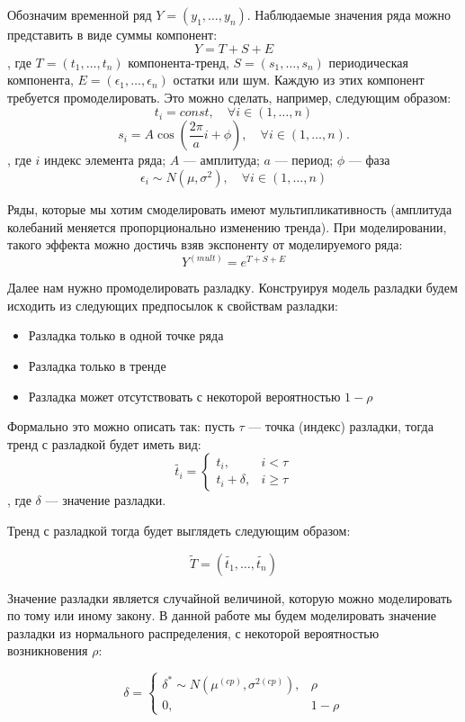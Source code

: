 \documentclass[%
12pt,
master,  %
natbib,      %
subf,        %
substylefile = spbu.rtx,
href,        %
colorlinks,  %
]{disser}
\begin{document}
Обозначим временной ряд $Y = (y_1, \dots, y_n)$. Наблюдаемые значения ряда можно представить в виде суммы компонент:
$$ Y = T + S + E $$, 
где  $ T = (t_1, \dots, t_n) $ компонента-тренд, $ S = (s_1, \dots, s_n) $ периодическая компонента, $ E = (\epsilon_1, \dots, \epsilon_n) $ остатки или шум.
Каждую из этих компонент требуется промоделировать. Это можно сделать, например, следующим образом:
$$ t_i = const, \quad \forall i \in (1, \dots, n) $$
$$ s_i = A \cos(\frac{2\pi}{a} i + \phi), \quad \forall i \in (1, \dots, n) .$$,
где $i$ индекс элемента ряда; $A$ --- амплитуда; $a$ --- период; $\phi$ --- фаза
$$ \epsilon_i \sim N(\mu, \sigma^2), \quad \forall i \in (1, \dots, n)  $$

Ряды, которые мы хотим смоделировать имеют мультипликативность (амплитуда колебаний меняется пропорционально изменению тренда). При моделировании, такого эффекта можно достичь взяв экспоненту от моделируемого ряда:
$$ Y^{(mult)} = e^{T + S + E} $$


Далее нам нужно промоделировать разладку. Конструируя модель разладки будем исходить из следующих предпосылок к свойствам разладки:
\begin{itemize}
	\item Разладка только в одной точке ряда
	\item Разладка только в тренде
	\item Разладка может отсутствовать с некоторой вероятностью $1 - \rho$
\end{itemize}
Формально это можно описать так: пусть $\tau$ --- точка (индекс) разладки, тогда тренд с разладкой будет иметь вид:
$$ \tilde{t_i} =
	\begin{cases}
		t_i, & i < \tau \\
		t_i + \delta, & i \geqslant \tau
	\end{cases}
$$
, где $ \delta $  --- значение разладки.

Тренд с разладкой тогда будет выглядеть следующим образом:

$$ \tilde{T} = (\tilde{t_1}, \dots, \tilde{t_n}) $$

Значение разладки является случайной величиной, которую можно моделировать по тому или иному закону. В данной работе мы будем моделировать значение разладки из нормального распределения, с некоторой вероятностью возникновения $ \rho $:

$$   
\delta = \begin{cases}
    		\delta^* \sim N(\mu^{(cp)}, \sigma^{2(cp)}), & \rho \\
  		0, & 1 - \rho
	\end{cases} 
$$
\end{document}
